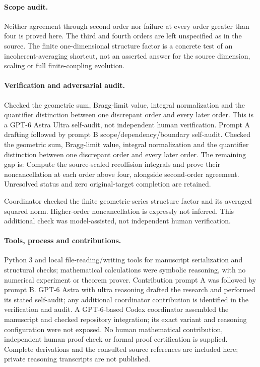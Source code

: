 \documentclass[11pt]{article}
\begin{document}
\paragraph{Scope audit.} Neither agreement through second order nor failure at every order greater than four is proved here. The third and fourth orders are left unspecified as in the source. The finite one-dimensional structure factor is a concrete test of an incoherent-averaging shortcut, not an asserted answer for the source dimension, scaling or full finite-coupling evolution.

\paragraph{Verification and adversarial audit.}
Checked the geometric sum, Bragg-limit value, integral normalization and the quantifier distinction between one discrepant order and every later order. This is a GPT-6 Astra Ultra self-audit, not independent human verification. Prompt A drafting followed by prompt B scope/dependency/boundary self-audit. Checked the geometric sum, Bragg-limit value, integral normalization and the quantifier distinction between one discrepant order and every later order. The remaining gap is: Compute the source-scaled recollision integrals and prove their noncancellation at each order above four, alongside second-order agreement. Unresolved status and zero original-target completion are retained.

Coordinator checked the finite geometric-series structure factor and its averaged squared norm. Higher-order noncancellation is expressly not inferred. This additional check was model-assisted, not independent human verification.

\paragraph{Tools, process and contributions.}
Python 3 and local file-reading/writing tools for manuscript serialization and structural checks; mathematical calculations were symbolic reasoning, with no numerical experiment or theorem prover. Contribution prompt A was followed by prompt B. GPT-6 Astra with ultra reasoning drafted the research and performed its stated self-audit; any additional coordinator contribution is identified in the verification and audit. A GPT-6-based Codex coordinator assembled the manuscript and checked repository integration; its exact variant and reasoning configuration were not exposed. No human mathematical contribution, independent human proof check or formal proof certification is supplied. Complete derivations and the consulted source references are included here; private reasoning transcripts are not published.
\end{document}
